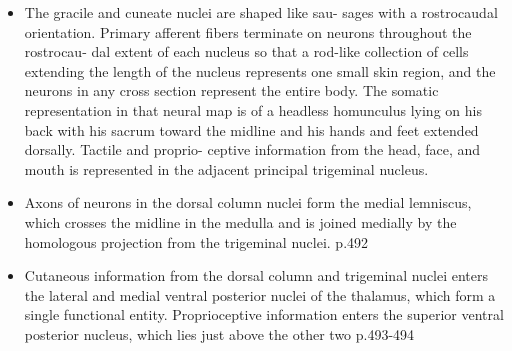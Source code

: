 \documentclass[12pt,a4paper,pdftex]{article}
\begin{document}
\begin{itemize}

    \item The gracile and cuneate nuclei are shaped like sau-
sages with a rostrocaudal orientation. Primary afferent
fibers terminate on neurons throughout the rostrocau-
dal extent of each nucleus so that a rod-like collection of
cells extending the length of the nucleus represents one
small skin region, and the neurons in any cross section
represent the entire body. The somatic representation
in that neural map is of a headless homunculus lying
on his back with his sacrum toward the midline and his
hands and feet extended dorsally. Tactile and proprio-
ceptive information from the head, face, and mouth is
represented in the adjacent principal trigeminal nucleus.

    \item Axons of neurons in the dorsal column nuclei form the medial lemniscus, which crosses the midline in the medulla and is joined medially by the homologous projection from the trigeminal nuclei. \cite{kandel2013principles} p.492
    \item Cutaneous information from the dorsal column
    and trigeminal nuclei enters the lateral and medial
    ventral posterior nuclei of the thalamus, which form
    a single functional entity. Proprioceptive information
    enters the superior ventral posterior nucleus, which
    lies just above the other two \cite{kandel2013principles} p.493-494
\end{itemize}
\end{document}
